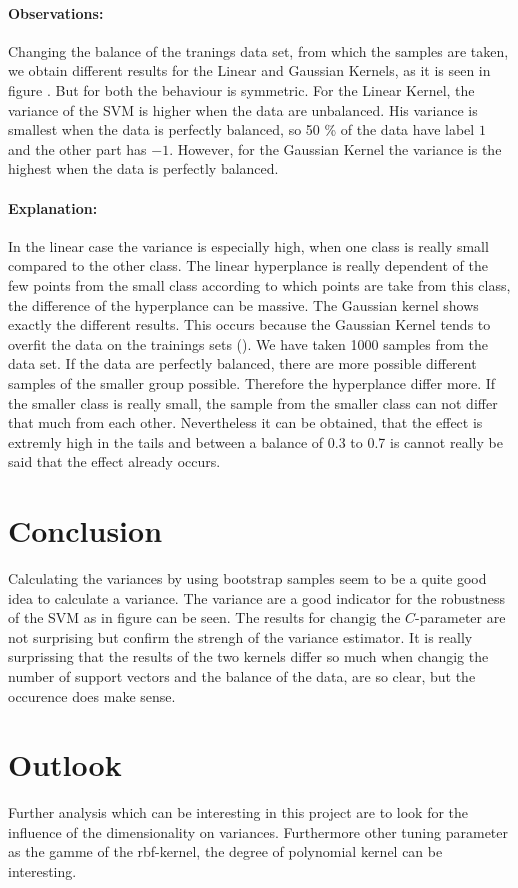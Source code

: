 \documentclass[a4paper]{article}
\begin{document}
\paragraph{Observations:}
Changing the balance of the tranings data set, from which the samples are taken, we obtain different results for the Linear and Gaussian Kernels, as it is seen in figure \label{fig5}. But for both the behaviour is symmetric. For the Linear Kernel, the variance of the SVM is higher when the data are unbalanced. His variance is smallest when the data is perfectly balanced, so 50 \% of the data have label $1$ and the other part has $-1$. However, for the Gaussian Kernel the variance is the highest when the data is perfectly balanced. 
\paragraph{Explanation:}
In the linear case the variance is especially high, when one class is really small compared to the other class. The linear hyperplance is really dependent of the few points from the small class according to which points are take from this class, the difference of the hyperplance can be massive.
The Gaussian kernel shows exactly the different results. This occurs because the Gaussian Kernel tends to overfit the data on the trainings sets (\cite{hastie_elements_2005}). We have taken 1000 samples from the data set. If the data are perfectly balanced, there are more possible different samples of the smaller group possible. Therefore the hyperplance differ more. If the smaller class is really small, the sample from the smaller class can not differ that much from each other.
Nevertheless it can be obtained, that the effect is extremly high in the tails and between a balance of 0.3 to 0.7 is cannot really be said that the effect already occurs.


\section{Conclusion}

Calculating the variances by using bootstrap samples seem to be a quite good idea to calculate a variance. The variance are a good indicator for the robustness of the SVM as in figure \label{fig2} can be seen.
The results for changig the $C$-parameter are not surprising but confirm the strengh of the variance estimator.
It is really surprissing that the results of the two kernels differ so much when changig the number of support vectors and the balance of the data, are so clear, but the occurence does make sense.

\section{Outlook}

Further analysis which can be interesting in this project are to look for the influence of the dimensionality on variances. Furthermore other tuning parameter as the gamme of the rbf-kernel, the degree of polynomial kernel can be interesting. 


\footnotesize


\end{document}
